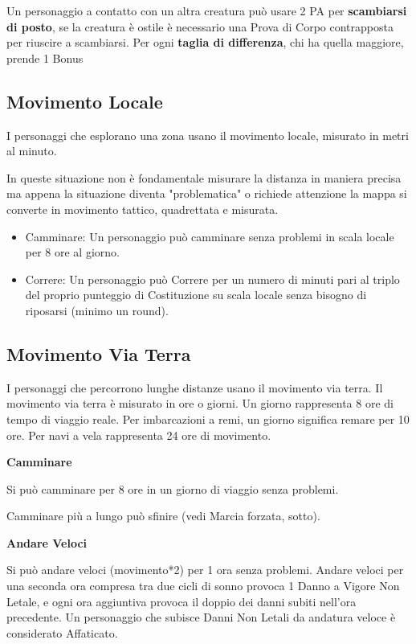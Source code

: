 \documentclass[12pt,a4paper,twoside,openany]{book}
\begin{document}
\begin{multicols}{2}
Un personaggio a contatto con un altra creatura può usare 2 PA per \textbf{scambiarsi di posto}, se la creatura è ostile è necessario una Prova di Corpo contrapposta per riuscire a scambiarsi. Per ogni \textbf{taglia di differenza}, chi ha quella maggiore, prende 1 Bonus 

\subsection{Movimento Locale}\label{movimentolocale}

I personaggi che esplorano una zona usano il movimento locale, misurato in metri al minuto.

In queste situazione non è fondamentale misurare la distanza in maniera precisa ma appena la situazione diventa "problematica" o richiede attenzione la mappa si converte in movimento tattico, quadrettata e misurata.

\medskip

\begin{itemize}
\item
Camminare: Un personaggio può camminare senza problemi in scala locale per 8 ore al giorno.
\item
Correre: Un personaggio può Correre per un numero di minuti pari al triplo del proprio punteggio di Costituzione su scala locale senza bisogno di riposarsi (minimo un round).
\end{itemize}


\subsection{Movimento Via Terra}\label{movimentoviaterra}

I personaggi che percorrono lunghe distanze usano il movimento via terra. Il movimento via terra è misurato in ore o giorni. Un giorno rappresenta 8 ore di tempo di viaggio reale. Per imbarcazioni a remi, un giorno significa remare per 10 ore. Per navi a vela rappresenta 24 ore di movimento.

\textbf{Camminare}\label{camminare}

Si può camminare per 8 ore in un giorno di viaggio senza problemi.

Camminare più a lungo può sfinire (vedi Marcia forzata, sotto).

\textbf{Andare Veloci}\label{andareveloci}

Si può andare veloci (movimento*2) per 1 ora senza problemi. Andare veloci per una seconda ora compresa tra due cicli di sonno provoca 1 Danno a Vigore Non Letale, e ogni ora aggiuntiva provoca il doppio dei danni subiti nell'ora precedente. Un personaggio che subisce Danni Non Letali da andatura veloce è considerato Affaticato.


\end{multicols}
\end{document}
